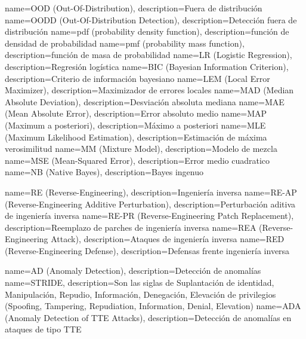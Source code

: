   {name={OOD (Out-Of-Distribution)},                  description={Fuera de distribución}}
 {name={OODD (Out-Of-Distribution Detection)},       description={Detección fuera de distribución}}
  {name={pdf (probability density function)},         description={función de densidad de probabilidad}}
  {name={pmf (probability mass function)},            description={función de masa de probabilidad}}
   {name={LR (Logistic Regression)},                   description={Regresión logística}}
  {name={BIC (Bayesian Information Criterion)},       description={Criterio de información bayesiano}}
  {name={LEM (Local Error Maximizer)},                description={Maximizador de errores locales}}
  {name={MAD (Median Absolute Deviation)},            description={Desviación absoluta mediana}}
  {name={MAE (Mean Absolute Error)},                  description={Error absoluto medio}}
  {name={MAP (Maximum a posteriori)},                 description={Máximo a posteriori}}
  {name={MLE (Maximum Likelihood Estimation)},        description={Estimación de máxima verosimilitud}}
   {name={MM (Mixture Model)},                         description={Modelo de mezcla}}
  {name={MSE (Mean-Squared Error)},                   description={Error medio cuadratico}}
   {name={NB (Native Bayes)},                          description={Bayes ingenuo}}


       {name={RE (Reverse-Engineering)},                           description={Ingeniería inversa}}
    {name={RE-AP (Reverse-Engineering Additive Perturbation)},  description={Perturbación aditiva de ingeniería inversa}}
    {name={RE-PR (Reverse-Engineering Patch Replacement)},      description={Reemplazo de parches de ingeniería inversa}}
      {name={REA (Reverse-Engineering Attack)},                   description={Ataques de ingeniería inversa}}
      {name={RED (Reverse-Engineering Defense)},                  description={Defensas frente ingeniería inversa}}


       {name={AD (Anomaly Detection)}, description={Detección de anomalías}}
   {name={STRIDE},                 description={Son las siglas de Suplantación de identidad, Manipulación, Repudio, Información, Denegación, Elevación de privilegios (Spoofing, Tampering, Repudiation, Information, Denial, Elevation)}}
  {name={ADA (Anomaly Detection of TTE Attacks)}, description={Detección de anomalías en ataques de tipo TTE}}


